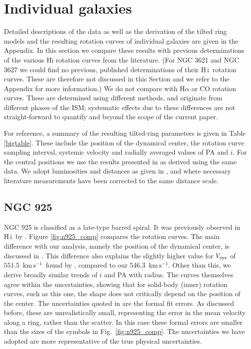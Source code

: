 \documentclass[usenatbib,usegraphicx,apjfonts,floatfix]{emulateapj}
\newcommand{\kms}{\ensuremath{\,\mbox{km}\,\mbox{s}^{-1}}}
\newcommand{\HI}{H\,{\sc i}}
\begin{document}
\section{Individual galaxies}

Detailed descriptions of the data as well as the derivation of the
tilted ring models and the resulting rotation curves of individual
galaxies are given in the Appendix.  In this section we compare
these results with previous determinations of the various H{\sc i}
rotation curves from the literature. (For NGC 3621 and NGC 3627 we
could find no previous, published determinations of their
\HI\ rotation curves. These are therefore  not discussed in this
Section and we refer to the Appendix for more information.) We do not
compare with H$\alpha$ or CO rotation curves.  These are determined
using different methods, and originate from different phases of the
ISM; systematic effects due to these differences are not
straight-forward to quantify and beyond the scope of the current
paper.

For reference, a summary of the resulting tilted-ring parameters is
given in Table \ref{bigtable}. These include the position of the
dynamical center, the rotation curve sampling interval, systemic
velocity and radially averaged values of PA and $i$. For the central
positions we use the results presented in \citet{clemens2007} as
derived using the same data. We adopt luminosities and distances as
given in \citet{THINGS1}, and where necessary literature measurements
have been corrected to the same distance scale.

\subsection{NGC 925\label{sec:indiv_gal_begin}}

NGC 925 is classified as a late-type barred spiral. It was previously
observed in \HI\ by \citet{DJ}. Figure \ref{fig:n925_comp} compares
the rotation curves.  The main difference with our analysis, namely
the position of the dynamical center, is discussed in
\citet{clemens2007}. This difference also explains the slightly higher
value for $V_{\rm sys}$ of $551.5$ \kms\ found by \citet{DJ}, compared
to our 546.3 \kms. Other than this, we derive broadly similar trends
of $i$ and PA with radius. The curves themselves agree within the
uncertainties, showing that for solid-body (inner) rotation curves,
such as this one, the shape does not critically depend on the position
of the center. The uncertainties quoted in \citet{DJ} are the formal
fit errors. As discussed before, these are unrealistically small,
representing the error in the mean velocity along a ring, rather than
the scatter. In this case these formal errors are smaller than the
sizes of the symbols in Fig.~\ref{fig:n925_comp}.  The uncertainties
we have adopted are more representative of the true physical
uncertainties.
\end{document}
